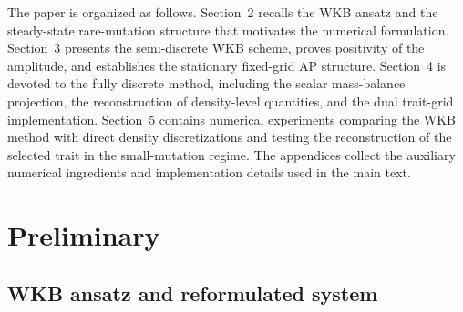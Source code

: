 \documentclass[11pt]{article}
\begin{document}
The paper is organized as follows.  Section~2 recalls the WKB ansatz and the
steady-state rare-mutation structure that motivates the numerical formulation.
Section~3 presents the semi-discrete WKB scheme, proves positivity of the
amplitude, and establishes the stationary fixed-grid AP structure.  Section~4
is devoted to the fully discrete method, including the scalar mass-balance
projection, the reconstruction of density-level quantities, and the dual
trait-grid implementation.  Section~5 contains numerical experiments comparing
the WKB method with direct density discretizations and testing the
reconstruction of the selected trait in the small-mutation regime.  The
appendices collect the auxiliary numerical ingredients and implementation
details used in the main text.





\section{Preliminary}

\subsection{WKB ansatz and reformulated system}
\end{document}
